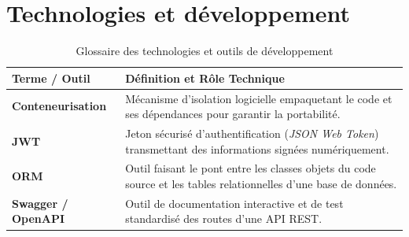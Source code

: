 \section*{Technologies et d\'eveloppement}
\begin{table}[H]
\centering
\begin{tabularx}{\textwidth}{p{4.2cm} X}
\toprule
\textbf{Terme / Outil} & \textbf{D\'efinition et R\^ole Technique} \\
\midrule
\textbf{Conteneurisation} & M\'ecanisme d'isolation logicielle empaquetant le code et ses d\'ependances pour garantir la portabilit\'e. \\
\textbf{JWT}              & Jeton s\'ecuris\'e d'authentification (\textit{JSON Web Token}) transmettant des informations sign\'ees num\'eriquement. \\
\textbf{ORM}              & Outil faisant le pont entre les classes objets du code source et les tables relationnelles d'une base de donn\'ees. \\
\textbf{Swagger / OpenAPI}& Outil de documentation interactive et de test standardis\'e des routes d'une API REST. \\
\bottomrule
\end{tabularx}
\caption{Glossaire des technologies et outils de d\'eveloppement}
\label{tab:glossaire-tech}
\end{table}
